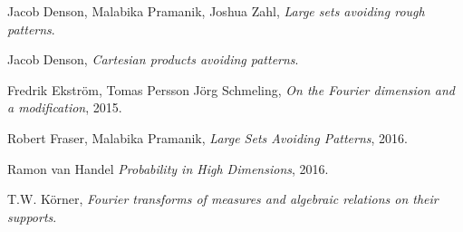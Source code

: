 \documentclass[12pt,reqno]{article}
\numberwithin{equation}{section}
\numberwithin{theorem}{section}
\begin{document}
\begin{comment}
so this causes us no problems since we only care about whether $A$ is differentiable except at finitely many points. To analyze $A(x_0)$ when $f'(x_0) = 0$, we note that a solution that gives the maximum either satisfies
%
\[ f'(x)(f'(x)^2 + 1) + (x - x_0) f''(x) = 0 \]
%
or
%
\[ x - x_0 = \frac{\varepsilon f'(x)}{\sqrt{1 + f'(x)^2}} \]
%
or
%
\[ x - x_0 = \frac{-\varepsilon f'(x)}{\sqrt{1 + f'(x)^2}}. \]
%
If $\varepsilon$ is small enough, then the implicit function theorem implies that the second and third equations have finitely many solutions for each $x_0$, which are locally smoothly parameterized. Since $f'(x_0) \neq 0$, the first equation does not even have any solutions if $\varepsilon \lesssim 1$. Thus we conclude that if $\varepsilon$ is small enough, there exists a function $x(x_0)$ which is smooth, except at finitely many points, such that
%
\[ g(x_0) = f(x) + \frac{x - x_0}{f'(x)}. \]
%
Thus at any $x_0$ where $x$ is smooth, we conclude
%
\[ g'(x_0) = f'(x) \cdot x' + \frac{x' - 1}{f'(x)} - \frac{x - x_0}{f'(x)^2} f''(x) x'. \]

\end{comment}

\begin{thebibliography}{9}

    Jacob Denson, Malabika Pramanik, Joshua Zahl,
    \textit{Large sets avoiding rough patterns}.

    Jacob Denson,
    \textit{Cartesian products avoiding patterns}.

    Fredrik Ekstr\"{o}m, Tomas Persson J\"{o}rg Schmeling,
    \textit{On the {F}ourier dimension and a modification},
    2015.

    Robert Fraser, Malabika Pramanik,
    \textit{Large Sets Avoiding Patterns},
    2016.


    Ramon van Handel
    \textit{Probability in High Dimensions},
    2016.


    T.W. K\"{o}rner,
    \textit{{F}ourier transforms of measures and algebraic relations on their supports}.


\end{thebibliography}
\end{document}
